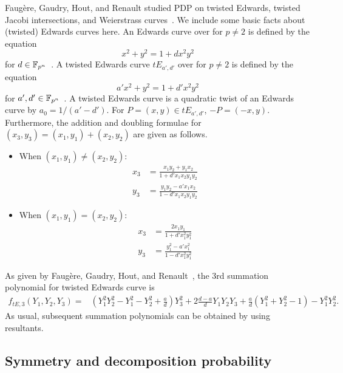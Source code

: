 Faug\`ere, Gaudry, Hout, and Renault studied PDP on twisted Edwards,
twisted Jacobi intersections, and Weierstrass
curves~\cite{DBLP:journals/joc/FaugereGHR14}.
%
We include some basic facts about (twisted) Edwards curves here.
%
%
An Edwards curve over  for $p\neq 2$ is defined by the
equation \begin{equation*}
  x^2+y^2=1+dx^2y^2 \label{eq:edwards-curve} \end{equation*} for
$d\in\mathbb F_{p^n}$~\cite{DBLP:journals/iacr/BernsteinL07}.
%
A twisted Edwards curve $tE_{a',d'}$ over  for $p\neq 2$ is
defined by the equation \begin{equation}
  a'x^2+y^2=1+d'x^2y^2 \label{eq:twisted-edwards-curve} \end{equation}
for $a',d'\in\mathbb F_{p^n}$~\cite{DBLP:journals/iacr/BernsteinBJLP08}.
%
A twisted Edwards curve is a quadratic twist of an Edwards curve by
$a_0=1/(a'-d')$.
%
For $P=(x,y)\in tE_{a',d'}$, $-P=(-x,y)$.
%
Furthermore, the addition and doubling formulae for
$(x_3,y_3)=(x_1,y_1)+(x_2,y_2)$ are given as follows.
%
\begin{itemize}
\item When $(x_1,y_1)\neq(x_2,y_2)$:
  \begin{align*}
    x_3 & = \frac{x_1y_2 + y_1x_2}{1 + d'x_1x_2y_1y_2} \\
    y_3 & = \frac{y_1y_2 - a'x_1x_2}{1 - d'x_1x_2y_1y_2}
  \end{align*}
\item When $(x_1,y_1)=(x_2,y_2)$:
  \begin{align*}
    x_3 & = \frac{2x_1y_1}{1 + d'x_1^2y_1^2} \\
    y_3 & = \frac{y_1^2 - a'x_1^2}{1 - d'x_1^2y_1^2}
  \end{align*}
\end{itemize}
%
As given by Faug\`ere, Gaudry, Hout, and
Renault~\cite{DBLP:journals/joc/FaugereGHR14}, the 3rd summation
polynomial for twisted Edwards curve is
%
\begin{align*}
  f_{tE, 3}(Y_1,Y_2,Y_3) = & \left(Y_1^2Y_2^2 - Y_1^2 - Y_2^2 + \frac{a}{d}\right)Y_3^2  + 2\frac{d-a}{d}Y_1Y_2Y_3 +
                             \frac{a}{d}\left(Y_1^2 + Y_2^2 - 1\right)
                             - Y_1^2Y_2^2.
\end{align*}
%
As usual, subsequent summation polynomials can be obtained by using
resultants.



\subsection{Symmetry and decomposition probability}
\label{sec:symmetry-decomposition-probability}

